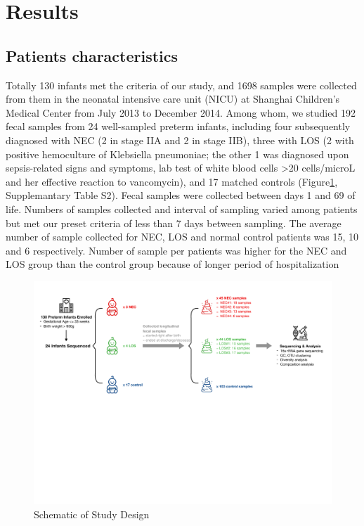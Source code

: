 \documentclass[fleqn,10pt]{wlpeerj} %
\begin{document}
\section*{Results}
  \subsection*{Patients characteristics}
   Totally 130 infants met the criteria of our study, and 1698 samples were collected from them in the neonatal intensive care unit (NICU) at Shanghai Children’s Medical Center from July 2013 to December 2014.  Among whom, we studied 192 fecal samples from 24 well-sampled preterm infants, including four subsequently diagnosed with NEC (2 in stage IIA and 2 in stage IIB), three with LOS (2 with positive hemoculture of Klebsiella pneumoniae; the other 1 was diagnosed upon sepsis-related signs and symptoms, lab test of white blood cells >20 cells/microL and her effective reaction to vancomycin), and 17 matched controls (Figure\ref{fig:design}, Supplemantary Table S2). Fecal samples were collected between days 1 and 69 of life. Numbers of samples collected and interval of sampling varied among patients but met our preset criteria of less than 7 days between sampling. The average number of sample collected for NEC, LOS and normal control patients was 15, 10 and 6 respectively.  Number of sample per patients was higher for the NEC and LOS group than the control group because of longer period of hospitalization
     \begin{figure}[ht]\centering
       \includegraphics[width=\linewidth]{figure/sheme.pdf}
       \caption{Schematic of Study Design}
       \label{fig:design}
     \end{figure}
\end{document}
